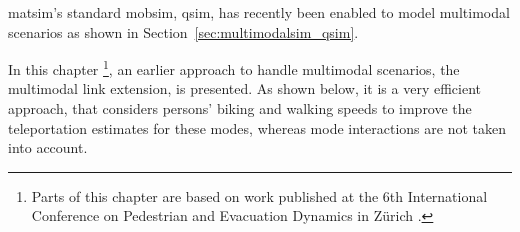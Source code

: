 \gls{matsim}'s standard \gls{mobsim}, \gls{qsim}, has recently been enabled to model \gls{multimodal} scenarios as shown in Section~\ref{sec:multimodalsim_qsim}. 

In this chapter \footnote{Parts of this chapter are based on work published at the 6th International Conference on Pedestrian and Evacuation Dynamics in Zürich \cite{00DoblerLaemmelAxhausen2012PedMultiModal}.},
 an earlier approach to handle \gls{multimodal} scenarios, the \gls{multimodal} link extension, is presented. As shown below, it is a very efficient approach, that considers persons' biking and walking speeds to improve the teleportation estimates for these modes, whereas mode interactions are not taken into account. 


